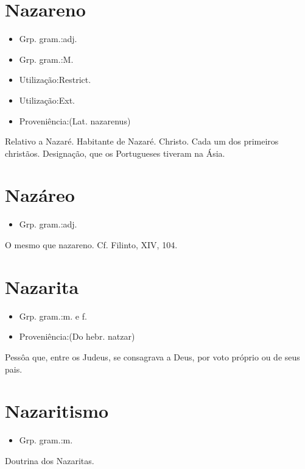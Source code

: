 \section{Nazareno}
\begin{itemize}
\item {Grp. gram.:adj.}
\end{itemize}
\begin{itemize}
\item {Grp. gram.:M.}
\end{itemize}
\begin{itemize}
\item {Utilização:Restrict.}
\end{itemize}
\begin{itemize}
\item {Utilização:Ext.}
\end{itemize}
\begin{itemize}
\item {Proveniência:(Lat. \textunderscore nazarenus\textunderscore )}
\end{itemize}
Relativo a Nazaré.
Habitante de Nazaré.
Christo.
Cada um dos primeiros christãos.
Designação, que os Portugueses tiveram na Ásia.
\section{Nazáreo}
\begin{itemize}
\item {Grp. gram.:adj.}
\end{itemize}
O mesmo que \textunderscore nazareno\textunderscore . Cf. Filinto, XIV, 104.
\section{Nazarita}
\begin{itemize}
\item {Grp. gram.:m.  e  f.}
\end{itemize}
\begin{itemize}
\item {Proveniência:(Do hebr. \textunderscore natzar\textunderscore )}
\end{itemize}
Pessôa que, entre os Judeus, se consagrava a Deus, por voto próprio ou de seus pais.
\section{Nazaritismo}
\begin{itemize}
\item {Grp. gram.:m.}
\end{itemize}
Doutrina dos Nazaritas.
